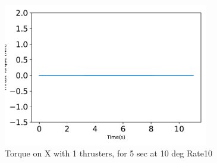 \begin{figure}[htbp]\centerline{\includegraphics[width=0.8\textwidth]{AutoTeX/Torque_1Thrusters_5s_10deg_Loc2_Rate10}}\caption{Torque on X with 1 thrusters, for 5 sec at 10 deg Rate10}\label{fig:Torque_1Thrusters_5s_10deg_Loc2_Rate10}\end{figure}